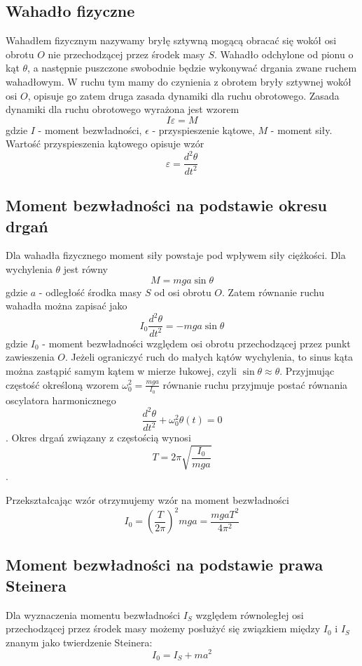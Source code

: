 \documentclass[a4paper,10pt,twoside]{article}
\begin{document}
	\subsection{Wahadło fizyczne}
	
	Wahadłem fizycznym nazywamy bryłę sztywną mogącą obracać się wokół osi obrotu $O$ nie przechodzącej przez środek masy $S$. Wahadło odchylone od pionu o kąt $\theta$, a następnie puszczone swobodnie będzie wykonywać drgania zwane ruchem wahadłowym. W ruchu tym mamy do czynienia z obrotem bryły sztywnej wokół osi $O$, opisuje go zatem druga zasada dynamiki dla ruchu obrotowego.
	Zasada dynamiki dla ruchu obrotowego wyrażona jest wzorem $$I\varepsilon = M$$ gdzie $I$ - moment bezwładności, $\epsilon$ - przyspieszenie kątowe, $M$ - moment siły. Wartość przyspieszenia kątowego opisuje wzór $$\varepsilon = \frac{d^2\theta}{dt^2}$$
	
	\subsection{Moment bezwładności na podstawie okresu drgań}
	Dla wahadła fizycznego moment siły powstaje pod wpływem siły ciężkości. Dla wychylenia $\theta$ jest równy $$M = m g a \sin\theta$$ gdzie $a$ - odległość środka masy $S$ od osi obrotu $O$. Zatem równanie ruchu wahadła można zapisać jako $$ I_0 \frac{d^2\theta}{dt^2} = -m g a \sin \theta$$ gdzie $I_0$ - moment bezwładności względem osi obrotu przechodzącej przez punkt zawieszenia $O$. Jeżeli ograniczyć ruch do małych kątów wychylenia, to sinus kąta można zastąpić samym kątem w mierze łukowej, czyli $\sin\theta \approx \theta$. Przyjmując częstość określoną wzorem $\omega_0^2 = \frac{mga}{I_0}$  równanie ruchu przyjmuje postać równania oscylatora harmonicznego $$ \frac{d^2\theta}{dt^2}+\omega_0^2\theta(t) = 0$$. Okres drgań związany z częstością wynosi $$ T = 2 \pi \sqrt{\frac{I_0}{mga}} $$.
	
	Przekształcając wzór otrzymujemy wzór na moment bezwładności $$ I_0 = (\frac{T}{2\pi})^2mga = \frac{mgaT^2}{4\pi^2}$$
	
	\subsection{Moment bezwładności na podstawie prawa Steinera}
	
	Dla wyznaczenia momentu bezwładności $I_S$ względem równoległej osi przechodzącej przez środek masy możemy posłużyć się związkiem między $I_0$ i $I_S$ znanym jako twierdzenie Steinera: 
	$$ I_0 = I_S + ma^2$$
	
\end{document}

